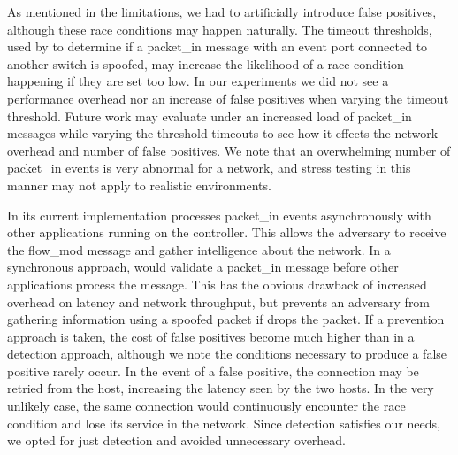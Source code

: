  As mentioned in the limitations, we had
to artificially introduce false positives, although these race conditions
may happen naturally. The timeout thresholds, used by \name to determine 
if a packet\_in message with an event port connected to another switch
is spoofed, may increase the likelihood of a race condition happening if
they are set too low. In our experiments we did not see a performance
overhead nor an increase of false positives when varying the timeout
threshold. Future work may evaluate \name under an increased load of
packet\_in messages while varying the threshold timeouts to see how it
effects the network overhead and number of false positives. We note that
an overwhelming number of packet\_in events is very abnormal for a
network, and stress testing in this manner may not apply to realistic
environments.

 In its current
implementation \name processes packet\_in events asynchronously with
other applications running on the controller. This allows the adversary
to receive the flow\_mod message and gather intelligence about the
network. In a synchronous approach, \name would validate a packet\_in
message before other applications process the message. This has the
obvious drawback of increased overhead on latency and network
throughput, but prevents an adversary from gathering information using a
spoofed packet if \name drops the packet. If a prevention approach is
taken, the cost of false positives become much higher than in a
detection approach, although we note the conditions necessary to
produce a false positive rarely occur. In the event of a false positive,
the connection may be retried from the host, increasing the latency seen
by the two hosts. In the very unlikely case, the same connection would 
continuously encounter the race condition and lose its service in the 
network. Since detection satisfies our needs, we opted for just detection
and avoided unnecessary overhead.
